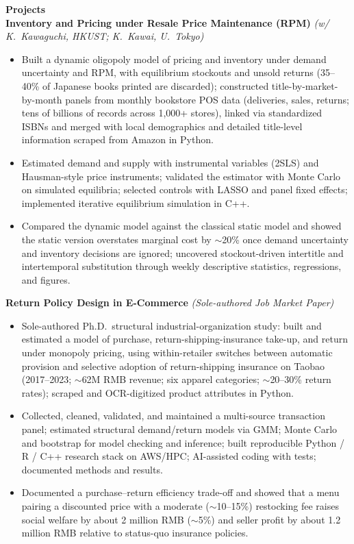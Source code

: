\documentclass[11pt,letterpaper]{article}
\begin{document}
{\large \textbf{Projects}}\\[-0.5pt]
\textbf{Inventory and Pricing under Resale Price Maintenance (RPM)} \textit{(w/ K.\ Kawaguchi, HKUST; K.\ Kawai, U.\ Tokyo)}\\
\vspace{-6pt}
\begin{itemize}
  \item Built a dynamic oligopoly model of pricing and inventory under demand uncertainty and RPM, with equilibrium stockouts and unsold returns (35--40\% of Japanese books printed are discarded); constructed title-by-market-by-month panels from monthly bookstore POS data (deliveries, sales, returns; tens of billions of records across 1{,}000+ stores), linked via standardized ISBNs and merged with local demographics and detailed title-level information scraped from Amazon in Python.
  \item Estimated demand and supply with instrumental variables (2SLS) and Hausman-style price instruments; validated the estimator with Monte Carlo on simulated equilibria; selected controls with LASSO and panel fixed effects; implemented iterative equilibrium simulation in C++.
  \item Compared the dynamic model against the classical static model and showed the static version overstates marginal cost by \(\sim\)20\% once demand uncertainty and inventory decisions are ignored; uncovered stockout-driven intertitle and intertemporal substitution through weekly descriptive statistics, regressions, and figures.
\end{itemize}
\vspace{-3pt}
\textbf{Return Policy Design in E-Commerce} \textit{(Sole-authored Job Market Paper)}\\
\vspace{-6pt}
\begin{itemize}
  \item Sole-authored Ph.D.\ structural industrial-organization study: built and estimated a model of purchase, return-shipping-insurance take-up, and return under monopoly pricing, using within-retailer switches between automatic provision and selective adoption of return-shipping insurance on Taobao (2017--2023; \(\sim\)62M RMB revenue; six apparel categories; \(\sim\)20--30\% return rates); scraped and OCR-digitized product attributes in Python.
  \item Collected, cleaned, validated, and maintained a multi-source transaction panel; estimated structural demand/return models via GMM; Monte Carlo and bootstrap for model checking and inference; built reproducible Python / R / C++ research stack on AWS/HPC; AI-assisted coding with tests; documented methods and results.
  \item Documented a purchase--return efficiency trade-off and showed that a menu pairing a discounted price with a moderate (\(\sim\)10--15\%) restocking fee raises social welfare by about 2 million RMB (\(\sim\)5\%) and seller profit by about 1.2 million RMB relative to status-quo insurance policies.
\end{itemize}
\end{document}
